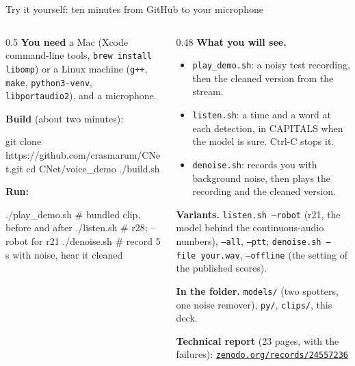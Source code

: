\documentclass[aspectratio=169,10pt]{beamer}
\begin{document}
\begin{frame}[fragile]{Try it yourself: ten minutes from GitHub to your microphone}
\small
\begin{columns}[T]
\begin{column}{0.5\textwidth}
\textbf{You need} a Mac (Xcode command-line tools, \texttt{brew install libomp}) or a Linux machine (\texttt{g++}, \texttt{make}, \texttt{python3-venv}, \texttt{libportaudio2}), and a microphone.

\medskip
\textbf{Build} (about two minutes):
\begin{semiverbatim}\scriptsize
git clone https://github.com/crasmarum/CNet.git
cd CNet/voice_demo
./build.sh
\end{semiverbatim}

\textbf{Run:}
\begin{semiverbatim}\scriptsize
./play_demo.sh   # bundled clip, before and after
./listen.sh      # r28; --robot for r21
./denoise.sh     # record 5 s with noise, hear it cleaned
\end{semiverbatim}
\end{column}
\begin{column}{0.48\textwidth}
\textbf{What you will see.}
\begin{itemize}
\item \texttt{play\_demo.sh}: a noisy test recording, then the cleaned version from the stream.
\item \texttt{listen.sh}: a time and a word at each detection, in CAPITALS when the model is sure. Ctrl-C stops it.
\item \texttt{denoise.sh}: records you with background noise, then plays the recording and the cleaned version.
\end{itemize}
\medskip
\textbf{Variants.} \texttt{listen.sh --robot} (r21, the model behind the continuous-audio numbers), \texttt{--all}, \texttt{--ptt}; \texttt{denoise.sh --file your.wav}, \texttt{--offline} (the setting of the published scores).

\medskip
\textbf{In the folder.} \texttt{models/} (two spotters, one noise remover), \texttt{py/}, \texttt{clips/}, this deck.

\medskip
\textbf{Technical report} (23 pages, with the failures): \href{https://zenodo.org/records/24557236}{\texttt{zenodo.org/records/24557236}}
\end{column}
\end{columns}
\end{frame}
\end{document}
